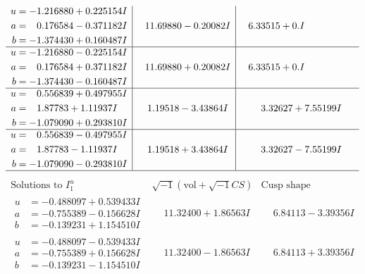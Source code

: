 \documentclass[1p]{elsarticle_modified}
\theoremstyle{definition}
\newcommand{\I}{\sqrt{-1}}
\begin{document}
$$\begin{array}{c|c|c}
\begin{aligned}
u &= -1.216880 + 0.225154 I \\
a &= \phantom{-}0.176584 - 0.371182 I \\
b &= -1.374430 + 0.160487 I\end{aligned}
 & \phantom{-}11.69880 - 0.20082 I & \phantom{-}6.33515 + 0. I\phantom{ +0.000000I} \\ \hline\begin{aligned}
u &= -1.216880 - 0.225154 I \\
a &= \phantom{-}0.176584 + 0.371182 I \\
b &= -1.374430 - 0.160487 I\end{aligned}
 & \phantom{-}11.69880 + 0.20082 I & \phantom{-}6.33515 + 0. I\phantom{ +0.000000I} \\ \hline\begin{aligned}
u &= \phantom{-}0.556839 + 0.497955 I \\
a &= \phantom{-}1.87783 + 1.11937 I \\
b &= -1.079090 + 0.293810 I\end{aligned}
 & \phantom{-}1.19518 - 3.43864 I & \phantom{-}3.32627 + 7.55199 I \\ \hline\begin{aligned}
u &= \phantom{-}0.556839 - 0.497955 I \\
a &= \phantom{-}1.87783 - 1.11937 I \\
b &= -1.079090 - 0.293810 I\end{aligned}
 & \phantom{-}1.19518 + 3.43864 I & \phantom{-}3.32627 - 7.55199 I\\
 \hline 
 \end{array}$$\newpage$$\begin{array}{c|c|c}  
\text{Solutions to }I^u_{1}& \I (\text{vol} + \sqrt{-1}CS) & \text{Cusp shape}\\
 \hline 
\begin{aligned}
u &= -0.488097 + 0.539433 I \\
a &= -0.755389 - 0.156628 I \\
b &= -0.139231 + 1.154510 I\end{aligned}
 & \phantom{-}11.32400 + 1.86563 I & \phantom{-}6.84113 - 3.39356 I \\ \hline\begin{aligned}
u &= -0.488097 - 0.539433 I \\
a &= -0.755389 + 0.156628 I \\
b &= -0.139231 - 1.154510 I\end{aligned}
 & \phantom{-}11.32400 - 1.86563 I & \phantom{-}6.84113 + 3.39356 I \\ \hline\begin{aligned}

\end{aligned}
\end{array}$$
\end{document}
